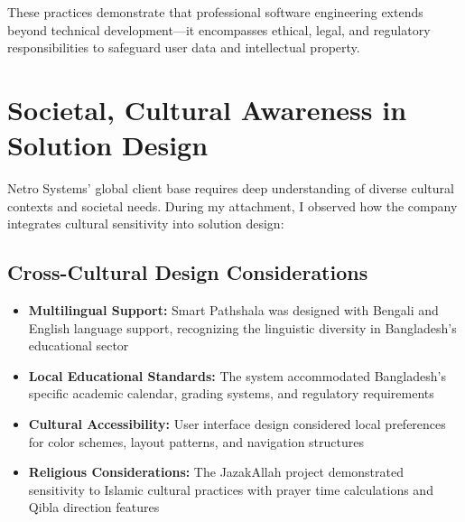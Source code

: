 \documentclass[12pt,a4paper]{report}
\newcommand{\skill}[1]{\textcolor{skillcolor}{\textbf{#1}}}
\let\oldcite\cite
\renewcommand{\cite}[1]{\textcolor{impactcolor}{\oldcite{#1}}}
\newenvironment{coloritemize}
{\begin{itemize}[label=\textcolor{primaryblue}{$\bullet$}]}
{\end{itemize}}
\begin{document}
These practices demonstrate that professional software engineering \cite{ref11} extends beyond technical development—it encompasses ethical, legal, and regulatory responsibilities to safeguard user data and intellectual property.

\section{Societal, Cultural Awareness in Solution Design}
Netro Systems' global client base requires deep understanding of diverse cultural contexts and societal needs. During my attachment, I observed how the company integrates cultural sensitivity into solution design:

\subsection{Cross-Cultural Design Considerations}
\begin{coloritemize}
    \item \skill{Multilingual Support:} Smart Pathshala was designed with Bengali and English language support, recognizing the linguistic diversity in Bangladesh's educational sector
    \item \skill{Local Educational Standards:} The system accommodated Bangladesh's specific academic calendar, grading systems, and regulatory requirements
    \item \skill{Cultural Accessibility:} User interface design considered local preferences for color schemes, layout patterns, and navigation structures
    \item \skill{Religious Considerations:} The JazakAllah project demonstrated sensitivity to Islamic cultural practices with prayer time calculations and Qibla direction features
\end{coloritemize}
\end{document}
